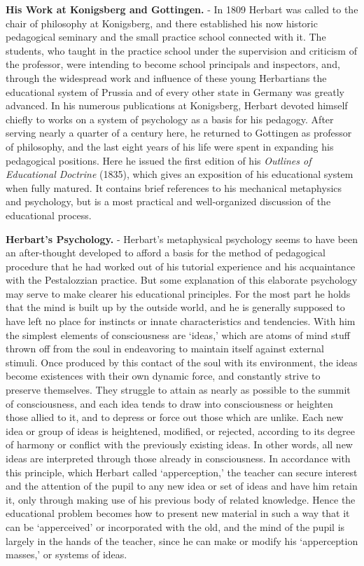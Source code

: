 \documentclass[
]{book}
\begin{document}
\textbf{His Work at Konigsberg and Gottingen.} - In 1809 Herbart was called to the chair of philosophy at Konigsberg, and there established his now historic pedagogical seminary and the small practice school connected with it. The students, who taught in the practice school under the supervision and criticism of the professor, were intending to become school principals and inspectors, and, through the widespread work and influence of these young Herbartians the educational system of Prussia and of every other state in Germany was greatly advanced. In his numerous publications at Konigsberg, Herbart devoted himself chiefly to works on a system of psychology as a basis for his pedagogy. After serving nearly a quarter of a century here, he returned to Gottingen as professor of philosophy, and the last eight years of his life were spent in expanding his pedagogical positions. Here he issued the first edition of his \emph{Outlines of Educational Doctrine} (1835), which gives an exposition of his educational system when fully matured. It contains brief references to his mechanical metaphysics and psychology, but is a most practical and well-organized discussion of the educational process.

\textbf{Herbart's Psychology.} - Herbart's metaphysical psychology seems to have been an after-thought developed to afford a basis for the method of pedagogical procedure that he had worked out of his tutorial experience and his acquaintance with the Pestalozzian practice. But some explanation of this elaborate psychology may serve to make clearer his educational principles. For the most part he holds that the mind is built up by the outside world, and he is generally supposed to have left no place for instincts or innate characteristics and tendencies. With him the simplest elements of consciousness are `ideas,' which are atoms of mind stuff thrown off from the soul in endeavoring to maintain itself against external stimuli. Once produced by this contact of the soul with its environment, the ideas become existences with their own dynamic force, and constantly strive to preserve themselves. They struggle to attain as nearly as possible to the summit of consciousness, and each idea tends to draw into consciousness or heighten those allied to it, and to depress or force out those which are unlike. Each new idea or group of ideas is heightened, modified, or rejected, according to its degree of harmony or conflict with the previously existing ideas. In other words, all new ideas are interpreted through those already in consciousness. In accordance with this principle, which Herbart called `apperception,' the teacher can secure interest and the attention of the pupil to any new idea or set of ideas and have him retain it, only through making use of his previous body of related knowledge. Hence the educational problem becomes how to present new material in such a way that it can be `apperceived' or incorporated with the old, and the mind of the pupil is largely in the hands of the teacher, since he can make or modify his `apperception masses,' or systems of ideas.
\end{document}
